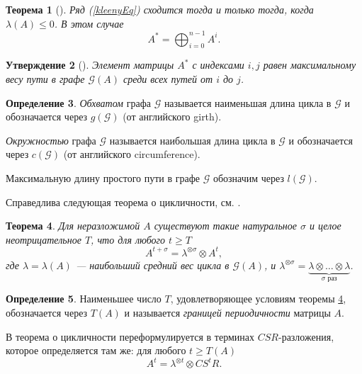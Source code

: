 \documentclass[12pt]{article}
\newtheorem{theorem}{Теорема}[section]
\newtheorem{proposition}[theorem]{Утверждение}
\theoremstyle{definition}
\newtheorem{definition}[theorem]{Определение}
\begin{document}
\begin{theorem} [{\cite[теорема 2.2, часть 1]{onVisualizationScaling}}]
Ряд (\ref{kleenyEq}) сходится тогда и только тогда, когда $\lambda(A) \le 0$. В этом случае 
\begin{equation*}
A^* = \bigoplus_{i = 0}^{n - 1} A^i.
\end{equation*}
\end{theorem}

\begin{proposition} [{\cite[равенство (8)]{15WeakCSRExpantion}}]
Элемент матрицы $A^*$ с индексами $i, j$ равен максимальному весу пути в графе $\mathcal{G}(A)$ среди всех путей от $i$ до $j$.
\end{proposition}

\begin{definition}
\label{girthCircCD}
\textit{Обхватом} графа $\mathcal{G}$ называется наименьшая длина цикла в $\mathcal{G}$ и обозначается через $g(\mathcal{G})$ (от английского girth).

\textit{Окружностью} графа $\mathcal{G}$ называется наибольшая длина цикла в $\mathcal{G}$ и обозначается через $c(\mathcal{G})$ (от английского circumference).

Максимальную длину простого пути в графе $\mathcal{G}$ обозначим через $l(\mathcal{G})$.
\end{definition}

Справедлива следующая теорема о цикличности, см. \cite[теорема 3.9]{maxPlusAtWork}.

\begin{theorem}
\label{Tdefinition}
Для неразложимой $A$ существуют такие натуральное $\sigma$ и целое неотрицательное $T$, что для любого $t \ge T$\begin{equation*}
A^{t + \sigma} = \lambda^{\otimes \sigma} \otimes A^t,
\end{equation*}
где $\lambda = \lambda(A)$ --- наибольший средний вес цикла в $\mathcal{G}(A)$, и $\lambda^{\otimes \sigma} = \underbrace{\lambda \otimes \dots \otimes \lambda}_{\sigma \text{ раз}}$.
\end{theorem}

\begin{definition}
Наименьшее число $T$, удовлетворяющее условиям теоремы \ref{Tdefinition}, обозначается через $T(A)$ и называется \textit{границей периодичности} матрицы $A$.
\end{definition}

В \cite{maxAlgebraicPowers} теорема о цикличности переформулируется в терминах $CSR$-разложения, которое определяется там же: для любого $t \ge T(A)$\begin{equation*}
A^t = \lambda^{\otimes t} \otimes CS^tR.
\end{equation*}
\end{document}
